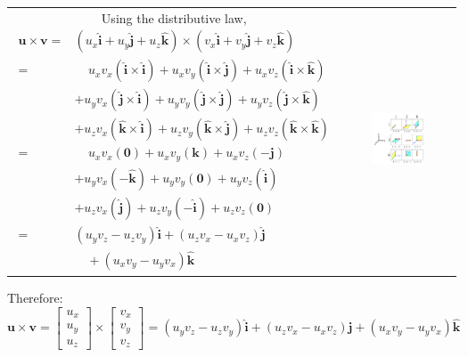 \documentclass{article}
\begin{document}
\begin{center}
\begin{tabular}{cc}
\parbox{0.5\textwidth}{
Using the distributive law, 
\begin{align*}
\mathbf{u} \times \mathbf{v} = & (u_x \hat{\mathbf{i}} + u_y \hat{\mathbf{j}} + u_z \hat{\mathbf{k}}) \times (v_x \hat{\mathbf{i}} + v_y \hat{\mathbf{j}} + v_z \hat{\mathbf{k}}) \\ 
= & \;\;\;\; u_x v_x (\hat{\mathbf{i}} \times \hat{\mathbf{i}}) + u_x v_y (\hat{\mathbf{i}} \times \hat{\mathbf{j}}) + u_x v_z (\hat{\mathbf{i}} \times \hat{\mathbf{k}}) \\
& + u_y v_x (\hat{\mathbf{j}} \times \hat{\mathbf{i}}) + u_y v_y (\hat{\mathbf{j}} \times \hat{\mathbf{j}}) + u_y v_z (\hat{\mathbf{j}} \times \hat{\mathbf{k}}) \\ 
& + u_z v_x (\hat{\mathbf{k}} \times \hat{\mathbf{i}}) + u_z v_y (\hat{\mathbf{k}} \times \hat{\mathbf{j}}) + u_z v_z (\hat{\mathbf{k}} \times \hat{\mathbf{k}}) \\ 
= & \;\;\;\; u_x v_x (\mathbf{0}) + u_x v_y (\mathbf{k}) + u_x v_z (-\mathbf{j}) \\
& + u_y v_x (-\hat{\mathbf{k}}) + u_y v_y (\mathbf{0}) + u_y v_z (\hat{\mathbf{i}}) \\ 
& + u_z v_x (\hat{\mathbf{j}}) + u_z v_y (-\hat{\mathbf{i}}) + u_z v_z (\mathbf{0}) \\ 
= & (u_y v_z - u_z v_y)\hat{\mathbf{i}} + (u_z v_x - u_x v_z)\hat{\mathbf{j}} \\
& \quad + (u_x v_y - u_y v_x)\hat{\mathbf{k}}
\end{align*}} & \parbox{0.5\textwidth}{
\includegraphics[width = 0.5\textwidth]{elementary_vector_cross_products}
}
\end{tabular}
Therefore:
\[\mathbf{u} \times \mathbf{v} = \begin{bmatrix} u_x \\ u_y \\ u_z \end{bmatrix} \times \begin{bmatrix} v_x \\ v_y \\ v_z \end{bmatrix} = (u_y v_z - u_z v_y)\hat{\mathbf{i}} + (u_z v_x - u_x v_z)\hat{\mathbf{j}} + (u_x v_y - u_y v_x)\hat{\mathbf{k}}
\]
\end{center}
\end{document}
